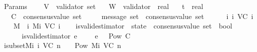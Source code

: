 \begin{isabellebody}
\isanewline
{}\isamarkupfalse%
\ Params\ {\isacharequal}\isanewline
\ \ \ V\ {\isacharcolon}{\isacharcolon}\ {\isachardoublequoteopen}validator\ set{\isachardoublequoteclose}\isanewline
\ \ \ W\ {\isacharcolon}{\isacharcolon}\ {\isachardoublequoteopen}validator\ {\isasymRightarrow}\ real{\isachardoublequoteclose}\isanewline
\ \ \ t\ {\isacharcolon}{\isacharcolon}\ real\isanewline
\ \ \ C\ {\isacharcolon}{\isacharcolon}\ {\isachardoublequoteopen}consensus{\isacharunderscore}value\ set{\isachardoublequoteclose}\isanewline
\ \ \ {\isasymepsilon}\ {\isacharcolon}{\isacharcolon}\ {\isachardoublequoteopen}message\ set\ {\isasymRightarrow}\ consensus{\isacharunderscore}value\ set{\isachardoublequoteclose}\isanewline
\isanewline
{}\isanewline
\ \ \isamarkupfalse%
\ {\isachardoublequoteopen}{\isasymSigma}\ {\isacharequal}\ {\isacharparenleft}{\isasymUnion}i{\isasymin}{\isasymnat}{\isachardot}\ {\isasymSigma}i\ {\isacharparenleft}V{\isacharcomma}C{\isacharcomma}{\isasymepsilon}{\isacharparenright}\ i{\isacharparenright}{\isachardoublequoteclose}\isanewline
\ \ \isamarkupfalse%
\ {\isachardoublequoteopen}M\ {\isacharequal}\ {\isacharparenleft}{\isasymUnion}i{\isasymin}{\isasymnat}{\isachardot}\ Mi\ {\isacharparenleft}V{\isacharcomma}C{\isacharcomma}{\isasymepsilon}{\isacharparenright}\ i{\isacharparenright}{\isachardoublequoteclose}\isanewline
\ \ \isamarkupfalse%
\ is{\isacharunderscore}valid{\isacharunderscore}estimator\ {\isacharcolon}{\isacharcolon}\ {\isachardoublequoteopen}{\isacharparenleft}state\ {\isasymRightarrow}\ consensus{\isacharunderscore}value\ set{\isacharparenright}\ {\isasymRightarrow}\ bool{\isachardoublequoteclose}\isanewline
\ \ \ \ \isanewline
\ \ \ \ \ \ {\isachardoublequoteopen}is{\isacharunderscore}valid{\isacharunderscore}estimator\ e\ {\isacharequal}\ {\isacharparenleft}{\isasymforall}{\isasymsigma}\ {\isasymin}\ {\isasymSigma}{\isachardot}\ e\ {\isasymsigma}\ {\isasymin}\ Pow\ C\ {\isacharminus}\ {\isacharbraceleft}{\isasymemptyset}{\isacharbraceright}{\isacharparenright}{\isachardoublequoteclose}\isanewline
\isanewline
\ \ \isanewline
\ \ \isamarkupfalse%
\ {\isasymSigma}i{\isacharunderscore}subset{\isacharunderscore}Mi{\isacharcolon}\ {\isachardoublequoteopen}{\isasymSigma}i\ {\isacharparenleft}V{\isacharcomma}C{\isacharcomma}{\isasymepsilon}{\isacharparenright}\ {\isacharparenleft}n\ {\isacharplus}\ {}{\isacharparenright}\ {\isasymsubseteq}\ Pow\ {\isacharparenleft}Mi\ {\isacharparenleft}V{\isacharcomma}C{\isacharcomma}{\isasymepsilon}{\isacharparenright}\ n{\isacharparenright}{\isachardoublequoteclose}\isanewline

\end{isabellebody}
